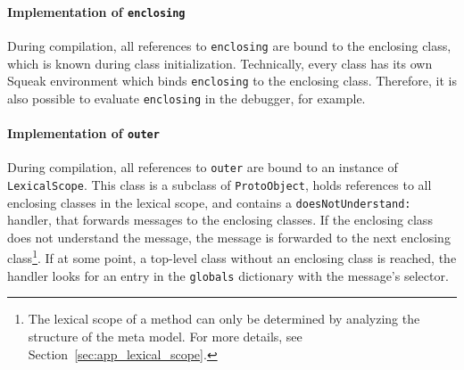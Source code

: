 \paragraph{Implementation of \texttt{enclosing}}
During compilation, all references to \texttt{enclosing} are bound to the enclosing class, which is known during class initialization. Technically, every class has its own Squeak environment which binds \texttt{enclosing} to the enclosing class. Therefore, it is also possible to evaluate \texttt{enclosing} in the debugger, for example.

\paragraph{Implementation of \texttt{outer}}
During compilation, all references to \texttt{outer} are bound to an instance of \texttt{LexicalScope}. This class is a subclass of \texttt{ProtoObject}, holds references to all enclosing classes in the lexical scope, and contains a \texttt{doesNotUnderstand:} handler, that forwards messages to the enclosing classes. If the enclosing class does not understand the message, the message is forwarded to the next enclosing class\footnote{The lexical scope of a method can only be determined by analyzing the structure of the meta model. For more details, see Section~\ref{sec:app_lexical_scope}.}. If at some point, a top-level class without an enclosing class is reached, the handler looks for an entry in the \texttt{globals} dictionary with the message's selector.

